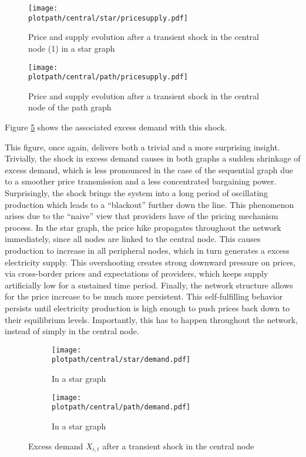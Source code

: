 \newpage
\begin{figure}[H]
  \centering
  \texttt{[image: \\plotpath/central/star/pricesupply.pdf]}
  \caption{Price and supply evolution after a transient shock in the central node (1) in a star graph} \label{fig:transshockcen_star}
\end{figure}

\begin{figure}[H]
  \centering
  \texttt{[image: \\plotpath/central/path/pricesupply.pdf]}
  \caption{Price and supply evolution after a transient shock in the central node of the path graph} \label{fig:transshockcen_path}
\end{figure}
\newpage

Figure \ref{fig:demandshock} shows the associated excess demand with this shock.

This figure, once again, delivers both a trivial and a more surprising insight. Trivially, the shock in excess demand causes in both graphs a sudden shrinkage of excess demand, which is less pronounced in the case of the sequential graph due to a smoother price transmission and a less concentrated bargaining power. Surprisingly, the shock brings the system into a long period of oscillating production which leads to a ``blackout'' further down the line. This phenomenon arises due to the ``naive'' view that providers have of the pricing mechanism process. In the star graph, the price hike propagates throughout the network immediately, since all nodes are linked to the central node. This causes production to increase in all peripheral nodes, which in turn generates a excess electricity supply. This overshooting creates strong downward pressure on prices, via cross-border prices and expectations of providers, which keeps supply artificially low for a sustained time period. Finally, the network structure allows for the price increase to be much more persistent. This self-fulfilling behavior persists until electricity production is high enough to push prices back down to their equilibrium levels. Importantly, this has to happen throughout the network, instead of simply in the central node.

\begin{center}
  \begin{figure}[H]
    \begin{subfigure}{0.475\textwidth}
      \centering
      \texttt{[image: \\plotpath/central/star/demand.pdf]}
      \caption{In a star graph} \label{fig:demandshock_star}
    \end{subfigure} \hfill
    \begin{subfigure}{0.475\textwidth}
      \centering
      \texttt{[image: \\plotpath/central/path/demand.pdf]}
      \caption{In a star graph} \label{fig:demandshock_path}
    \end{subfigure}
    \caption{Excess demand $X_{i, t}$ after a transient shock in the central node} \label{fig:demandshock}
  \end{figure}
\end{center}

